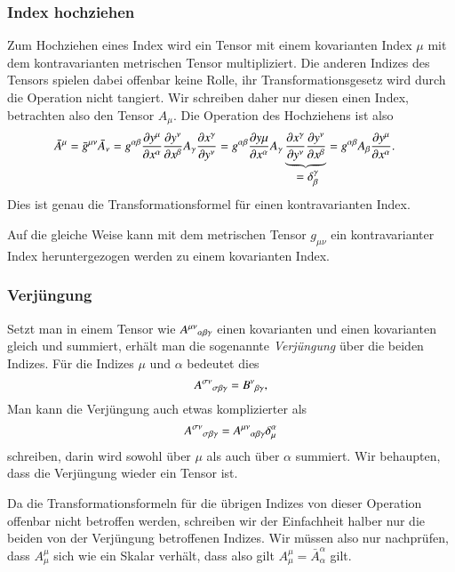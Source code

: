\subsubsection{Index hochziehen}
Zum {\index Hochziehen eines Index} wird ein Tensor mit einem kovarianten
Index $\mu$ mit dem kontravarianten metrischen Tensor multipliziert.
Die anderen Indizes des Tensors spielen dabei offenbar keine Rolle,
ihr Transformationsgesetz wird durch die Operation nicht tangiert.
Wir schreiben daher nur diesen einen Index, betrachten also den Tensor
$A_\mu$.
Die Operation des Hochziehens ist also
\begin{align*}
\bar A^\mu
=
\bar g^{\mu\nu}\bar A_\nu
&=
g^{\alpha\beta}
\frac{\partial y^\mu}{\partial x^\alpha}
\frac{\partial y^\nu}{\partial x^\beta}
A_\gamma
\frac{\partial x^\gamma}{\partial y^\nu}
=
g^{\alpha\beta}
\frac{\partial y\mu}{\partial x^\alpha}
A_\gamma
\underbrace{
\frac{\partial x^\gamma}{\partial y^\nu}
\frac{\partial y^\nu}{\partial x^\beta}
}_{\displaystyle \mathstrut= \delta^\gamma_\beta}
=
g^{\alpha\beta}
A_\beta
\frac{\partial y^\mu}{\partial x^\alpha}.
\end{align*}
Dies ist genau die Transformationsformel für einen kontravarianten Index.

Auf die gleiche Weise kann mit dem metrischen Tensor $g_{\mu\nu}$ ein
kontravarianter Index heruntergezogen werden zu einem kovarianten Index.

\subsubsection{Verjüngung}
Setzt man in einem Tensor wie $A^{\mu\nu}\mathstrut_{\alpha\beta\gamma}$
einen kovarianten und einen kovarianten gleich und summiert,
erhält man die sogenannte {\em Verjüngung} über die beiden Indizes.
Für die Indizes $\mu$ und $\alpha$ bedeutet dies
\[
A^{\sigma\nu}\mathstrut_{\sigma\beta\gamma}
=
B^\nu\mathstrut_{\beta\gamma},
\]
Man kann die Verjüngung auch etwas komplizierter als
\begin{equation}
A^{\sigma\nu}\mathstrut_{\sigma\beta\gamma}
=
A^{\mu\nu}\mathstrut_{\alpha\beta\gamma}\delta^\alpha_\mu
\label{skript:trafo:verjung}
\end{equation}
schreiben, darin wird sowohl über $\mu$ als auch über $\alpha$
summiert.
Wir behaupten, dass die Verjüngung wieder ein Tensor ist.

Da die Transformationsformeln für die übrigen Indizes von dieser
Operation offenbar nicht betroffen werden, schreiben wir der Einfachheit
halber nur die beiden von der Verjüngung betroffenen Indizes.
Wir müssen also nur nachprüfen, dass $A^\mu_\mu$ sich wie ein Skalar
verhält, dass also gilt $A^\mu_\mu=\bar A^\alpha_\alpha$ gilt.

